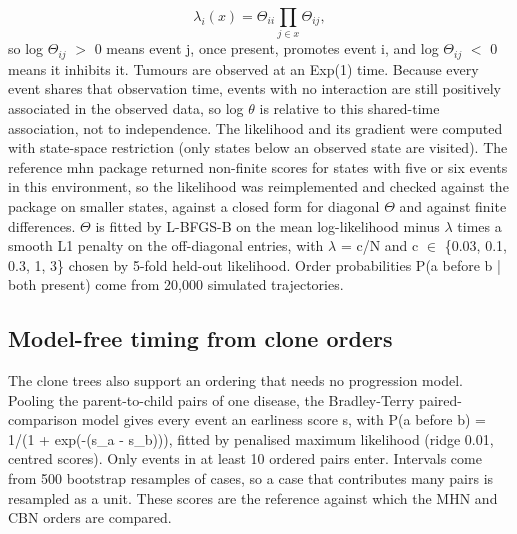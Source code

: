 \documentclass[conference]{IEEEtran}
\begin{document}
\begin{equation}\lambda_i(x) = \Theta_{ii} \prod_{j \in x} \Theta_{ij},\end{equation}
so log $\Theta_{ij}$ $>$ 0 means event j, once present, promotes event i, and log $\Theta_{ij}$ $<$ 0 means it inhibits it. Tumours are observed at an Exp(1) time. Because every event shares that observation time, events with no interaction are still positively associated in the observed data, so log $\theta$ is relative to this shared-time association, not to independence. The likelihood and its gradient were computed with state-space restriction (only states below an observed state are visited). The reference mhn package returned non-finite scores for states with five or six events in this environment, so the likelihood was reimplemented and checked against the package on smaller states, against a closed form for diagonal $\Theta$ and against finite differences. $\Theta$ is fitted by L-BFGS-B on the mean log-likelihood minus $\lambda$ times a smooth L1 penalty on the off-diagonal entries, with $\lambda$ = c/N and c $\in$ \{0.03, 0.1, 0.3, 1, 3\} chosen by 5-fold held-out likelihood. Order probabilities P(a before b | both present) come from 20,000 simulated trajectories.

\subsection{Model-free timing from clone orders}
The clone trees also support an ordering that needs no progression model. Pooling the parent-to-child pairs of one disease, the Bradley-Terry paired-comparison model \cite{bradleyterry1952} gives every event an earliness score s, with P(a before b) = 1/(1 + exp(-(s\_a - s\_b))), fitted by penalised maximum likelihood (ridge 0.01, centred scores). Only events in at least 10 ordered pairs enter. Intervals come from 500 bootstrap resamples of cases, so a case that contributes many pairs is resampled as a unit. These scores are the reference against which the MHN and CBN orders are compared.
\end{document}
